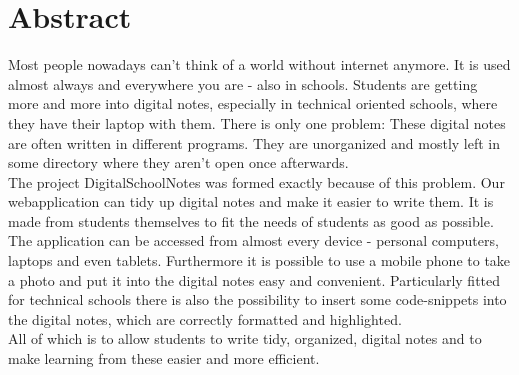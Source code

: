 \section*{Abstract}

Most people nowadays can't think of a world without internet anymore. It is used almost always and everywhere you are - also in schools. Students are getting more and more into digital notes, especially in technical oriented schools, where they have their laptop with them. There is only one problem: These digital notes are often written in different programs. They are unorganized and mostly left in some directory where they aren't open once afterwards.\\
The project DigitalSchoolNotes was formed exactly because of this problem. Our webapplication can tidy up digital notes and make it easier to write them. It is made from students themselves to fit the needs of students as good as possible. The application can be accessed from almost every device - personal computers, laptops and even tablets. Furthermore it is possible to use a mobile phone to take a photo and put it into the digital notes easy and convenient. Particularly fitted for technical schools there is also the possibility to insert some code-snippets into the digital notes, which are correctly formatted and highlighted.\\
All of which is to allow students to write tidy, organized, digital notes and to make learning from these easier and more efficient.
